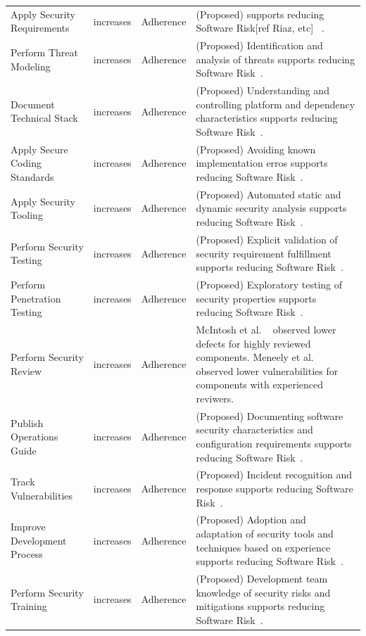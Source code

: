 \begin{table}[!htbp]
\begin{small}
\begin{tabular}{@{\extracolsep{5pt}}p{3cm}p{1cm}p{2cm}p{10cm}}
			Apply Security Requirements	&	increases	&	Adherence & (Proposed)  supports reducing Software Risk[ref Riaz, etc] ~\cite{morrison2017surveying}.\\
			Perform Threat Modeling &	increases &	Adherence &(Proposed) Identification and analysis of threats supports reducing Software Risk~\cite{morrison2017surveying}. \\	
			Document Technical Stack &	increases &	Adherence & (Proposed) Understanding and controlling platform and dependency characteristics supports reducing Software Risk~\cite{morrison2017surveying}.\\	
			Apply Secure Coding Standards &	increases	& Adherence & (Proposed)  Avoiding known implementation erros supports reducing Software Risk~\cite{morrison2017surveying}.\\
			Apply Security Tooling &	increases &	Adherence & (Proposed)  Automated static and dynamic security analysis supports reducing Software Risk~\cite{morrison2017surveying}.\\
			Perform Security Testing &	increases &	Adherence & (Proposed)  Explicit validation of security requirement fulfillment supports reducing Software Risk~\cite{morrison2017surveying}.\\	
			Perform Penetration Testing &	increases &	Adherence	& (Proposed)  Exploratory testing of security properties supports reducing Software Risk~\cite{morrison2017surveying}.\\
			Perform Security Review &	increases &	Adherence	&  McIntosh et al. ~\cite{mcintosh2014the} observed lower defects for highly reviewed components. Meneely et al. ~\cite{meneely2014empirical} observed lower vulnerabilities for components with experienced reviwers. \\
			Publish Operations Guide &	increases	& Adherence & (Proposed) Documenting software security characteristics and configuration requirements supports reducing Software Risk~\cite{morrison2017surveying}.\\
			Track Vulnerabilities &	increases &	Adherence & (Proposed) Incident recognition and response supports reducing Software Risk~\cite{morrison2017surveying}.\\	
			Improve Development Process &	increases &	Adherence & (Proposed)  Adoption and adaptation of security tools and techniques based on experience supports reducing Software Risk~\cite{morrison2017surveying}.\\	
			Perform Security Training &	increases &	Adherence	& (Proposed) Development team knowledge of security risks and mitigations supports reducing Software Risk~\cite{morrison2017surveying}.\\		

\end{tabular}
\end{small}
\end{table}
